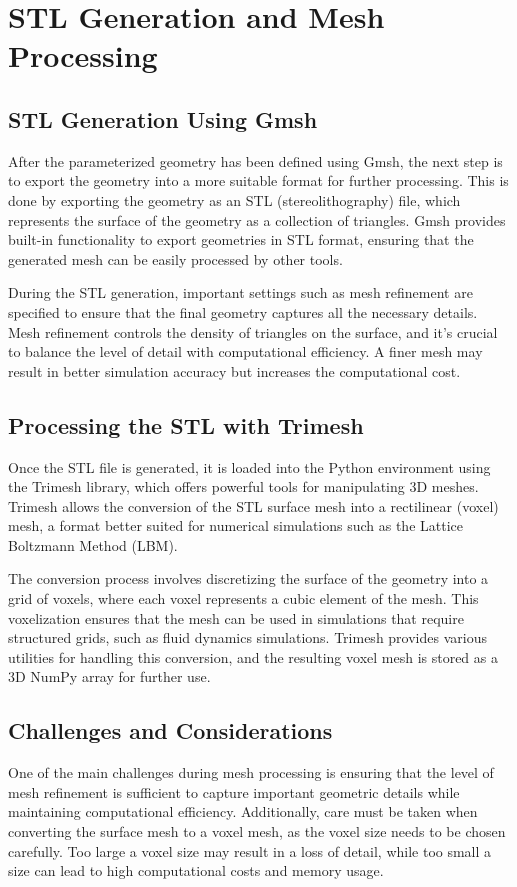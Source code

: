 \section{STL Generation and Mesh Processing}

\subsection{STL Generation Using Gmsh}

After the parameterized geometry has been defined using Gmsh, the next step is to export the geometry into a more suitable format for further processing. This is done by exporting the geometry as an STL (stereolithography) file, which represents the surface of the geometry as a collection of triangles. Gmsh provides built-in functionality to export geometries in STL format, ensuring that the generated mesh can be easily processed by other tools.

During the STL generation, important settings such as mesh refinement are specified to ensure that the final geometry captures all the necessary details. Mesh refinement controls the density of triangles on the surface, and it's crucial to balance the level of detail with computational efficiency. A finer mesh may result in better simulation accuracy but increases the computational cost.

\subsection{Processing the STL with Trimesh}

Once the STL file is generated, it is loaded into the Python environment using the Trimesh library, which offers powerful tools for manipulating 3D meshes. Trimesh allows the conversion of the STL surface mesh into a rectilinear (voxel) mesh, a format better suited for numerical simulations such as the Lattice Boltzmann Method (LBM).

The conversion process involves discretizing the surface of the geometry into a grid of voxels, where each voxel represents a cubic element of the mesh. This voxelization ensures that the mesh can be used in simulations that require structured grids, such as fluid dynamics simulations. Trimesh provides various utilities for handling this conversion, and the resulting voxel mesh is stored as a 3D NumPy array for further use.


\subsection{Challenges and Considerations}

One of the main challenges during mesh processing is ensuring that the level of mesh refinement is sufficient to capture important geometric details while maintaining computational efficiency. Additionally, care must be taken when converting the surface mesh to a voxel mesh, as the voxel size needs to be chosen carefully. Too large a voxel size may result in a loss of detail, while too small a size can lead to high computational costs and memory usage.
